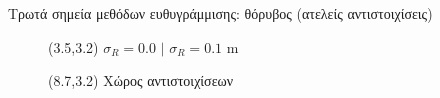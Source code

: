 \begin{frame}{\small Τρωτά σημεία μεθόδων ευθυγράμμισης: θόρυβος (ατελείς αντιστοιχίσεις)}

  \begin{figure}
      \begin{textblock}{4}(3.5,3.2)
        \scriptsize $\sigma_R = 0.0$ $|$ $\sigma_R = 0.1$ m \\
      \end{textblock}
      \begin{textblock}{4}(8.7,3.2)
        \scriptsize Χώρος αντιστοιχίσεων
      \end{textblock}
  \end{figure}

\end{frame}

